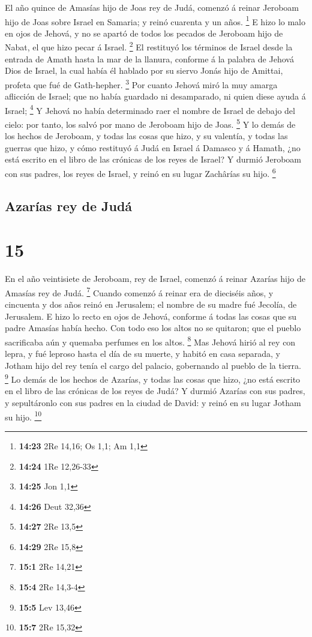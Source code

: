  El año quince de Amasías hijo de Joas rey de Judá, comenzó
á reinar Jeroboam hijo de Joas sobre Israel en Samaria; y reinó cuarenta
y un años. \footnote{\textbf{14:23} 2Re 14,16; Os 1,1; Am 1,1}
 E hizo lo malo en ojos de Jehová, y no se apartó de todos
los pecados de Jeroboam hijo de Nabat, el que hizo pecar á Israel.
\footnote{\textbf{14:24} 1Re 12,26-33}  El restituyó los
términos de Israel desde la entrada de Amath hasta la mar de la llanura,
conforme á la palabra de Jehová Dios de Israel, la cual había él hablado
por su siervo Jonás hijo de Amittai, profeta que fué de Gath-hepher.
\footnote{\textbf{14:25} Jon 1,1}  Por cuanto Jehová miró
la muy amarga aflicción de Israel; que no había guardado ni desamparado,
ni quien diese ayuda á Israel; \footnote{\textbf{14:26} Deut 32,36}
 Y Jehová no había determinado raer el nombre de Israel de
debajo del cielo: por tanto, los salvó por mano de Jeroboam hijo de
Joas. \footnote{\textbf{14:27} 2Re 13,5}  Y lo demás de los
hechos de Jeroboam, y todas las cosas que hizo, y su valentía, y todas
las guerras que hizo, y cómo restituyó á Judá en Israel á Damasco y á
Hamath, ¿no está escrito en el libro de las crónicas de los reyes de
Israel?  Y durmió Jeroboam con sus padres, los reyes de
Israel, y reinó en su lugar Zachârías su hijo. \footnote{\textbf{14:29}
  2Re 15,8}

\hypertarget{azaruxedas-rey-de-juduxe1}{%
\subsection{Azarías rey de Judá}\label{azaruxedas-rey-de-juduxe1}}

\hypertarget{section-14}{%
\section{15}\label{section-14}}

 En el año veintisiete de Jeroboam, rey de Israel, comenzó á
reinar Azarías hijo de Amasías rey de Judá. \footnote{\textbf{15:1} 2Re
  14,21}  Cuando comenzó á reinar era de dieciséis años, y
cincuenta y dos años reinó en Jerusalem; el nombre de su madre fué
Jecolía, de Jerusalem.  E hizo lo recto en ojos de Jehová,
conforme á todas las cosas que su padre Amasías había hecho.
 Con todo eso los altos no se quitaron; que el pueblo
sacrificaba aún y quemaba perfumes en los altos. \footnote{\textbf{15:4}
  2Re 14,3-4}  Mas Jehová hirió al rey con lepra, y fué
leproso hasta el día de su muerte, y habitó en casa separada, y Jotham
hijo del rey tenía el cargo del palacio, gobernando al pueblo de la
tierra. \footnote{\textbf{15:5} Lev 13,46}  Lo demás de los
hechos de Azarías, y todas las cosas que hizo, ¿no está escrito en el
libro de las crónicas de los reyes de Judá?  Y durmió
Azarías con sus padres, y sepultáronlo con sus padres en la ciudad de
David: y reinó en su lugar Jotham su hijo. \footnote{\textbf{15:7} 2Re
  15,32}

